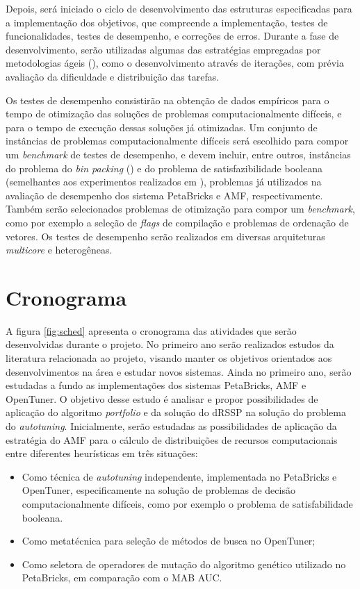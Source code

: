 \documentclass[a4paper, 11pt]{article}
\begin{document}
Depois, será iniciado o ciclo de desenvolvimento das estruturas especificadas
para a implementação dos objetivos, que compreende a implementação, 
testes de funcionalidades, testes de desempenho, e correções de erros.
Durante a fase de desenvolvimento, serão utilizadas algumas das estratégias
empregadas por metodologias ágeis (\citet{beck2000extreme}), como o 
desenvolvimento através de iterações, com prévia avaliação da dificuldade e 
distribuição das tarefas.

Os testes de desempenho consistirão na obtenção de dados empíricos para o tempo
de otimização das soluções de problemas computacionalmente difíceis, e para o 
tempo de execução dessas soluções já otimizadas. Um conjunto de instâncias de 
problemas computacionalmente difíceis será escolhido para compor
um \emph{benchmark} de testes de desempenho, e devem incluir, entre outros, 
instâncias do problema do \emph{bin packing} (\citet{de1981bin}) e do problema 
de satisfazibilidade booleana (semelhantes aos experimentos realizados em 
\citet{goldman2011optimizing}), problemas já utilizados na avaliação de 
desempenho dos sistema PetaBricks e AMF, respectivamente. Também serão 
selecionados problemas de otimização para compor um \emph{benchmark}, como por
exemplo a seleção de \emph{flags} de compilação e problemas de ordenação de 
vetores. Os testes de desempenho serão realizados em diversas arquiteturas
\emph{multicore} e heterogêneas.

\section{Cronograma} \label{sec:sched}

A figura \ref{fig:sched} apresenta o cronograma das atividades que serão
desenvolvidas durante o projeto. 
No primeiro ano serão realizados estudos da literatura relacionada ao projeto,
visando manter os objetivos orientados aos desenvolvimentos na área e
estudar novos sistemas. Ainda no primeiro ano, serão estudadas a fundo as 
implementações dos sistemas PetaBricks, AMF e OpenTuner. O objetivo desse
estudo é analisar e propor possibilidades de aplicação do algoritmo 
\emph{portfolio} e da solução do dRSSP na solução do problema do 
\emph{autotuning}. Inicialmente, serão estudadas as possibilidades de aplicação
da estratégia do AMF para o cálculo de distribuições de recursos computacionais
entre diferentes heurísticas em três situações:

\begin{itemize}
    \item Como técnica de \emph{autotuning} independente, implementada 
        no PetaBricks e OpenTuner, especificamente na solução de problemas
        de decisão computacionalmente difíceis, como por exemplo o problema
        de satisfabilidade booleana.
    \item Como metatécnica para seleção de métodos de busca no OpenTuner;
    \item Como seletora de operadores de mutação do algoritmo genético 
        utilizado no PetaBricks, em comparação com o MAB AUC.
\end{itemize}
\end{document}
